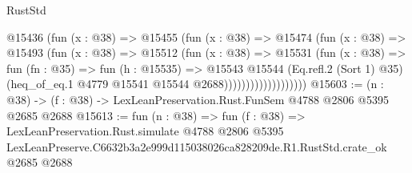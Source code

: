\begin{lexlean}{RustStd}
\begin{coremodule}
                          @15436
                            (fun (x : @38) =>
                            @15455
                              (fun (x : @38) =>
                              @15474
                                (fun (x : @38) =>
                                @15493
                                  (fun (x : @38) =>
                                  @15512
                                    (fun (x : @38) =>
                                    @15531
                                      (fun (x : @38) =>
                                      fun (fn : @35) =>
                                      fun (h : @15535) =>
                                      @15543
                                        @15544
                                        (Eq.refl.{2} (Sort 1) @35)
                                        (heq_of_eq.{1} @4779 @15541 @15544 @2688)))))))))))))))))))
@15603 := (n : @38) -> (f : @38) -> LexLeanPreservation.Rust.FunSem @4788 @2806 @5395 @2685 @2688
@15613 := fun (n : @38) =>
  fun (f : @38) =>
  LexLeanPreservation.Rust.simulate
    @4788
    @2806
    @5395
    LexLeanPreserve.C6632b3a2e999d115038026ca828209de.R1.RustStd.crate_ok
    @2685
    @2688
\end{coremodule}
\end{lexlean}
